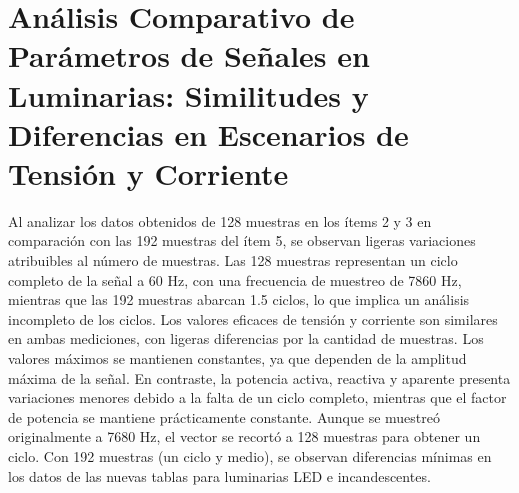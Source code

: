 \documentclass[conference]{IEEEtran}
\theoremstyle{mytheoremstyle}
\theoremstyle{mytheoremstyle}
\theoremstyle{myproblemstyle}
\begin{document}
        \section{Análisis Comparativo de Parámetros de Señales en Luminarias: Similitudes y Diferencias en Escenarios de Tensión y Corriente}
        Al analizar los datos obtenidos de 128 muestras en los ítems 2 y 3 en comparación con las 192 muestras del ítem 5, se observan ligeras variaciones atribuibles al número de muestras. Las 128 muestras representan un ciclo completo de la señal a 60 Hz, con una frecuencia de muestreo de 7860 Hz, mientras que las 192 muestras abarcan 1.5 ciclos, lo que implica un análisis incompleto de los ciclos. Los valores eficaces de tensión y corriente son similares en ambas mediciones, con ligeras diferencias por la cantidad de muestras. Los valores máximos se mantienen constantes, ya que dependen de la amplitud máxima de la señal. En contraste, la potencia activa, reactiva y aparente presenta variaciones menores debido a la falta de un ciclo completo, mientras que el factor de potencia se mantiene prácticamente constante. Aunque se muestreó originalmente a 7680 Hz, el vector se recortó a 128 muestras para obtener un ciclo. Con 192 muestras (un ciclo y medio), se observan diferencias mínimas en los datos de las nuevas tablas para luminarias LED e incandescentes.
        
        
\end{document}
